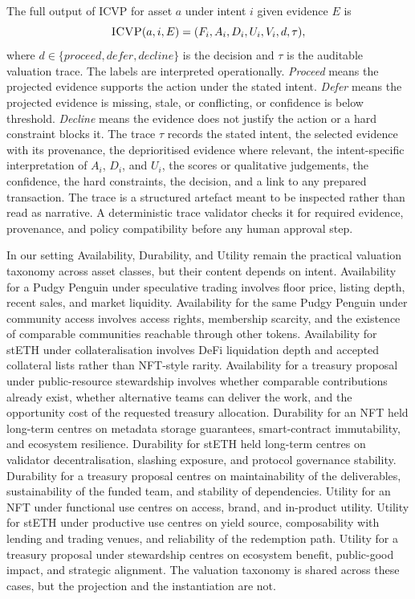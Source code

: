 The full output of ICVP for asset $a$ under intent $i$ given evidence $E$ is
\begin{equation}
\textsc{ICVP}(a, i, E) = (F_i, A_i, D_i, U_i, V_i, d, \tau),
\end{equation}
where $d \in \{\textit{proceed}, \textit{defer}, \textit{decline}\}$ is the decision and $\tau$ is the auditable valuation trace. The labels are interpreted operationally. \textit{Proceed} means the projected evidence supports the action under the stated intent. \textit{Defer} means the projected evidence is missing, stale, or conflicting, or confidence is below threshold. \textit{Decline} means the evidence does not justify the action or a hard constraint blocks it. The trace $\tau$ records the stated intent, the selected evidence with its provenance, the deprioritised evidence where relevant, the intent-specific interpretation of $A_i$, $D_i$, and $U_i$, the scores or qualitative judgements, the confidence, the hard constraints, the decision, and a link to any prepared transaction. The trace is a structured artefact meant to be inspected rather than read as narrative. A deterministic trace validator checks it for required evidence, provenance, and policy compatibility before any human approval step.

In our setting Availability, Durability, and Utility remain the practical valuation taxonomy across asset classes, but their content depends on intent. Availability for a Pudgy Penguin under speculative trading involves floor price, listing depth, recent sales, and market liquidity. Availability for the same Pudgy Penguin under community access involves access rights, membership scarcity, and the existence of comparable communities reachable through other tokens. Availability for stETH under collateralisation involves DeFi liquidation depth and accepted collateral lists rather than NFT-style rarity. Availability for a treasury proposal under public-resource stewardship involves whether comparable contributions already exist, whether alternative teams can deliver the work, and the opportunity cost of the requested treasury allocation. Durability for an NFT held long-term centres on metadata storage guarantees, smart-contract immutability, and ecosystem resilience. Durability for stETH held long-term centres on validator decentralisation, slashing exposure, and protocol governance stability. Durability for a treasury proposal centres on maintainability of the deliverables, sustainability of the funded team, and stability of dependencies. Utility for an NFT under functional use centres on access, brand, and in-product utility. Utility for stETH under productive use centres on yield source, composability with lending and trading venues, and reliability of the redemption path. Utility for a treasury proposal under stewardship centres on ecosystem benefit, public-good impact, and strategic alignment. The valuation taxonomy is shared across these cases, but the projection and the instantiation are not.

